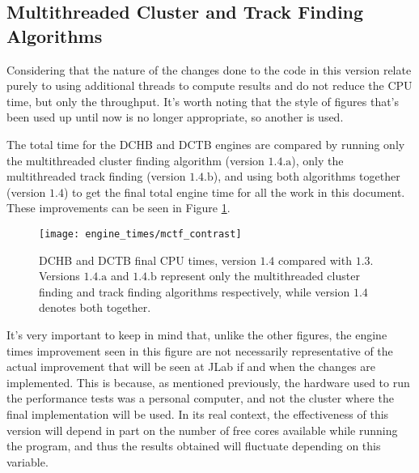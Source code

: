 \subsection{Multithreaded Cluster and Track Finding Algorithms} \label{ssec:val_multithreaded_ctf}
Considering that the nature of the changes done to the code in this version relate purely to using additional threads to compute results and do not reduce the CPU time, but only the throughput.
It's worth noting that the style of figures that's been used up until now is no longer appropriate, so another is used.

The total time for the DCHB and DCTB engines are compared by running only the multithreaded cluster finding algorithm (version $1.4.\text{a}$), only the multithreaded track finding (version $1.4.\text{b}$), and using both algorithms together (version $1.4$) to get the final total engine time for all the work in this document.
These improvements can be seen in Figure \ref{fig:engines_times-1_4}.

    \begin{figure}[ht]
        \centering
        \texttt{[image: engine\_times/mctf\_contrast]}
        \caption{\label{fig:engines_times-1_4} DCHB and DCTB final CPU times, version $1.4$ compared with $1.3$. Versions $1.4.\text{a}$ and $1.4.\text{b}$ represent only the multithreaded cluster finding and track finding algorithms respectively, while version $1.4$ denotes both together.}
    \end{figure}

\newpage

It's very important to keep in mind that, unlike the other figures, the engine times improvement seen in this figure are not necessarily representative of the actual improvement that will be seen at JLab if and when the changes are implemented.
This is because, as mentioned previously, the hardware used to run the performance tests was a personal computer, and not the cluster where the final implementation will be used.
In its real context, the effectiveness of this version will depend in part on the number of free cores available while running the program, and thus the results obtained will fluctuate depending on this variable.